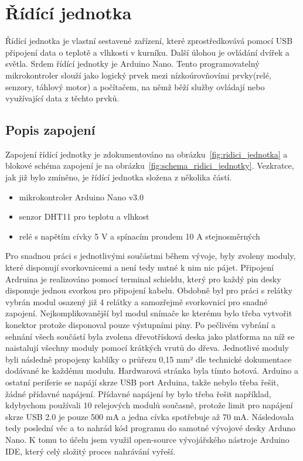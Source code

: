 \section{Řídící jednotka}\label{sec:ridici-jednotka}
Řídící jednotka je vlastní sestavené zařízení, které zprostředkovává pomocí USB připojení data o teplotě a vlhkosti v kurníku.
Další úlohou je ovládání dvířek a světla.
Srdem řídící jednotky je Arduino Nano.
Tento programovatelný mikrokontroler slouží jako logický prvek mezi nízkoúrovňovími prvky(relé, senzory, táhlový motor) a počítačem, na němž běží služby ovládají nebo využívající data z těchto prvků.

\subsection*{Popis zapojení}
Zapojení řídící jednotky je zdokumentováno na obrázku~\ref{fig:ridici_jednotka} a blokové schéma zapojení je na obrázku~\ref{fig:schema_ridici_jednotky}.
Vezkratce, jak již bylo zmíněno, je řídící jednotka složena z několika částí.
\begin{itemize}
    \item mikrokontroler Arduino Nano v3.0
    \item senzor DHT11 pro teplotu a vlhkost
    \item relé s napětím cívky 5 V a spínacím proudem 10 A stejnosměrných
\end{itemize}
Pro snadnou práci s jednotlivými součástmi během vývoje, byly zvoleny moduly, které disponují svorkovnicemi a není tedy nutné k nim nic pájet.
Připojení Ardruina je realizováno pomocí terminal schieldu, který pro každý pin desky disponuje jednou svorkou pro připojení kabelu.
Obdobně byl pro práci s relátky vybrán modul osazený již 4 relátky a samozřejmě svorkovnicí pro snadné zapojení.
Nejkomplikovanější byl modul snímače ke kterému bylo třeba vytvořit konektor protože disponoval pouze výstupními piny.
Po pečlivém vybrání a sehnání všech součástí byla zvolena dřevotřísková deska jako platforma na níž se naistalují všechny moduly pomocí krátkých vrutů do dřeva.
Jednotlivé moduly byli následně propojeny kablíky o průřezu 0,15 mm² dle technické dokumentace dodávané ke každému modulu.
Hardwarová stránka byla tímto hotová.
\newline
Arduino a ostatní periferie se napájí skrze USB port Arduina, takže nebylo třeba řešit, žádné přídavné napájení.
Přídavné napájení by bylo třeba řešit například, kdybychom používali 10 relejových modulů současně, protože limit pro napájení skrze USB 2.0 je pouze 500 mA a jedna cívka spotřebuje až 70 mA.\newline
Následovala tedy poslední věc a to nahrád kód programu do samotné vývojové desky Arduno Nano.
K tomu to účelu jsem využil open-source vývojářského nástroje Arduino IDE, který celý složitý proces nahrávání vyřeší.

